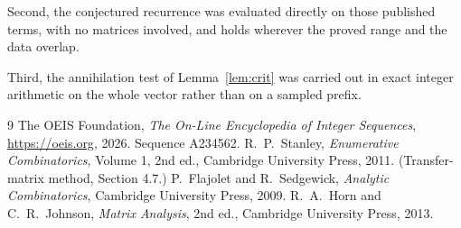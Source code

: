\documentclass[11pt,a4paper]{article}
\theoremstyle{plain}
\theoremstyle{definition}
\begin{document}
Second, the conjectured recurrence was evaluated directly on those published terms, with no
matrices involved, and holds wherever the proved range and the data overlap.

Third, the annihilation test of Lemma~\ref{lem:crit} was carried out in exact integer
arithmetic on the whole vector rather than on a sampled prefix.

\begin{thebibliography}{9}
 The OEIS Foundation, \emph{The On-Line Encyclopedia of Integer
Sequences}, \url{https://oeis.org}, 2026. Sequence A234562.
 R.~P.~Stanley, \emph{Enumerative Combinatorics}, Volume 1, 2nd ed.,
Cambridge University Press, 2011. (Transfer-matrix method, Section 4.7.)
 P.~Flajolet and R.~Sedgewick, \emph{Analytic Combinatorics}, Cambridge
University Press, 2009.
 R.~A.~Horn and C.~R.~Johnson, \emph{Matrix Analysis}, 2nd ed., Cambridge
University Press, 2013.
\end{thebibliography}
\end{document}
